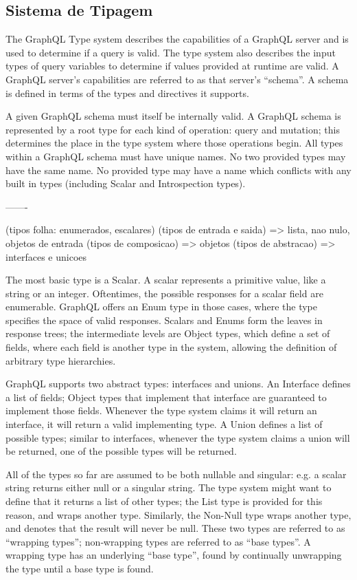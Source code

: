 \subsection[Sistema de Tipagem]{Sistema de Tipagem}

The GraphQL Type system describes the capabilities of a GraphQL server and is used to determine if a query is valid. The type system also describes the input types of query variables to determine if values provided at runtime are valid. A GraphQL server’s capabilities are referred to as that server’s “schema”. A schema is defined in terms of the types and directives it supports.

A given GraphQL schema must itself be internally valid. A GraphQL schema is represented by a root type for each kind of operation: query and mutation; this determines the place in the type system where those operations begin. All types within a GraphQL schema must have unique names. No two provided types may have the same name. No provided type may have a name which conflicts with any built in types (including Scalar and Introspection types).

-------

(tipos folha: enumerados, escalares)
(tipos de entrada e saida) => lista, nao nulo, objetos de entrada
(tipos de composicao) => objetos
(tipos de abstracao) => interfaces e unicoes

The most basic type is a Scalar. A scalar represents a primitive value, like a string or an integer. Oftentimes, the possible responses for a scalar field are enumerable. GraphQL offers an Enum type in those cases, where the type specifies the space of valid responses. Scalars and Enums form the leaves in response trees; the intermediate levels are Object types, which define a set of fields, where each field is another type in the system, allowing the definition of arbitrary type hierarchies.

GraphQL supports two abstract types: interfaces and unions. An Interface defines a list of fields; Object types that implement that interface are guaranteed to implement those fields. Whenever the type system claims it will return an interface, it will return a valid implementing type. A Union defines a list of possible types; similar to interfaces, whenever the type system claims a union will be returned, one of the possible types will be returned.

All of the types so far are assumed to be both nullable and singular: e.g. a scalar string returns either null or a singular string. The type system might want to define that it returns a list of other types; the List type is provided for this reason, and wraps another type. Similarly, the Non-Null type wraps another type, and denotes that the result will never be null. These two types are referred to as “wrapping types”; non‐wrapping types are referred to as “base types”. A wrapping type has an underlying “base type”, found by continually unwrapping the type until a base type is found.

